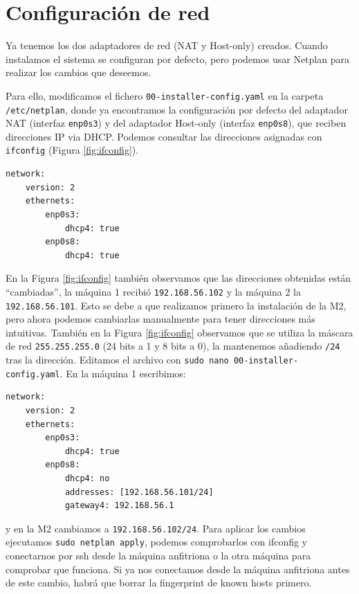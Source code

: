 \documentclass{article}
\begin{document}
\section{Configuración de red}

Ya tenemos los dos adaptadores de red (NAT y Host-only) creados. Cuando instalamos el sistema se configuran por defecto,
pero podemos usar Netplan para realizar los cambios que deseemos.

Para ello, modificamos el fichero \texttt{00-installer-config.yaml} en la carpeta \texttt{/etc/netplan}, donde ya encontramos
 la configuración por defecto del adaptador NAT (interfaz \texttt{enp0s3}) y del adaptador Host-only (interfaz \texttt{enp0s8}),
 que reciben direcciones IP via DHCP. Podemos consultar las direcciones asignadas con \texttt{ifconfig} (Figura \ref{fig:ifconfig}).

\begin{Verbatim}[tabsize=4]
network:
	version: 2
	ethernets:
		enp0s3:
			dhcp4: true
		enp0s8:
			dhcp4: true
\end{Verbatim}

En la Figura \ref{fig:ifconfig} también observamos que las direcciones obtenidas están ``cambiadas'', la máquina 1 recibió
 \texttt{192.168.56.102} y la máquina 2 la \texttt{192.168.56.101}. Esto se debe a que realizamos primero la instalación de la M2,
 pero ahora podemos cambiarlas manualmente para tener direcciones más intuitivas. También en la Figura \ref{fig:ifconfig} observamos
 que se utiliza la máscara de red \texttt{255.255.255.0} (24 bits a 1 y 8 bits a 0), la mantenemos añadiendo \texttt{/24} tras la dirección.
  Editamos el archivo con 
 \texttt{sudo nano 00-installer-config.yaml}. En la máquina 1 escribimos:

\begin{Verbatim}[tabsize=4]
network:
	version: 2
	ethernets:
		enp0s3:
			dhcp4: true
		enp0s8:
			dhcp4: no
			addresses: [192.168.56.101/24]
			gateway4: 192.168.56.1
\end{Verbatim}

y en la M2 cambiamos a \texttt{192.168.56.102/24}. Para aplicar los cambios ejecutamos \texttt{sudo netplan apply}, podemos comprobarlos
con ifconfig y conectarnos por ssh desde la máquina anfitriona o la otra máquina para comprobar que funciona. Si ya nos conectamos
desde la máquina anfitriona antes de este cambio, habrá que borrar la fingerprint de known hosts primero.
\end{document}
